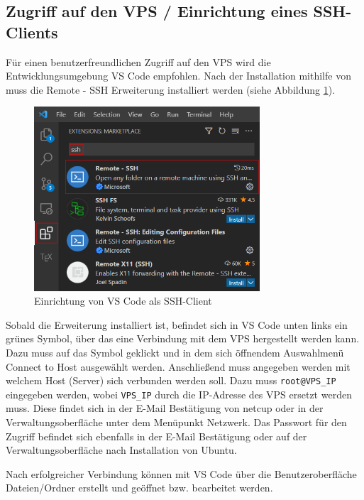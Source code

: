 \subsection{Zugriff auf den VPS / Einrichtung eines SSH-Clients}
Für einen benutzerfreundlichen Zugriff auf den \ac{VPS} wird die Entwicklungsumgebung \ac{VS Code} empfohlen. Nach der Installation mithilfe von \cite{VSCode} muss die \glqq Remote - SSH\grqq{} Erweiterung installiert werden (siehe Abbildung \ref{fig:vscode-remote-ssh}).

\begin{figure}[H]
  \includegraphics[width=0.75\textwidth]{images/vscode-remote-ssh.png}
  \centering
  \caption[Einrichtung von VS Code als SSH-Client]{Einrichtung von VS Code als SSH-Client}
  \label{fig:vscode-remote-ssh}
\end{figure}

Sobald die Erweiterung installiert ist, befindet sich in \ac{VS Code} unten links ein grünes Symbol, über das eine Verbindung mit dem \ac{VPS} hergestellt werden kann. Dazu muss auf das Symbol geklickt und in dem sich öffnendem Auswahlmenü \glqq Connect to Host\grqq{} ausgewählt werden. Anschließend muss angegeben werden mit welchem Host (Server) sich verbunden werden soll. Dazu muss \lstinline{root@VPS_IP} eingegeben werden, wobei \lstinline{VPS_IP} durch die IP-Adresse des \ac{VPS} ersetzt werden muss. Diese findet sich in der E-Mail Bestätigung von netcup oder in der Verwaltungsoberfläche unter dem Menüpunkt \glqq Netzwerk\grqq{}. Das Passwort für den Zugriff befindet sich ebenfalls in der E-Mail Bestätigung oder auf der Verwaltungsoberfläche nach Installation von Ubuntu.

Nach erfolgreicher Verbindung können mit \ac{VS Code} über die Benutzeroberfläche Dateien/Ordner erstellt und geöffnet bzw. bearbeitet werden.

